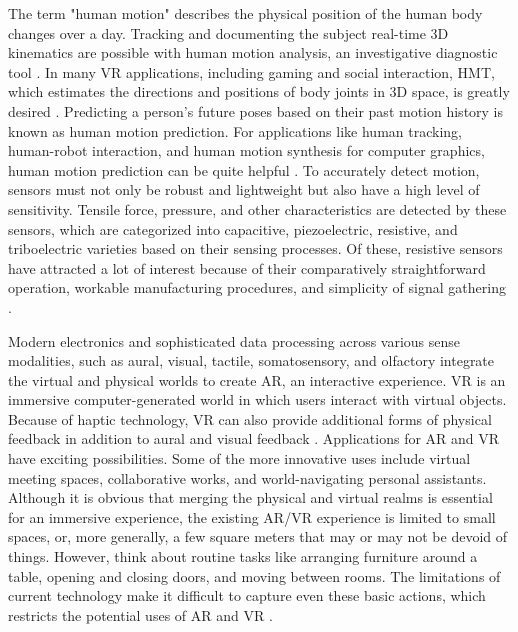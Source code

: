 \documentclass[conference]{IEEEtran}
\begin{document}
The term "human motion" describes the physical position of the human body changes over a day. Tracking and documenting the subject real-time 3D kinematics are possible with human motion analysis, an investigative diagnostic tool \cite{b1}. In many VR applications, including gaming and social interaction, HMT, which estimates the directions and positions of body joints in 3D space, is greatly desired \cite{b2}. Predicting a person's future poses based on their past motion history is known as human motion prediction. For applications like human tracking, human-robot interaction, and human motion synthesis for computer graphics, human motion prediction can be quite helpful \cite{b3}. To accurately detect motion, sensors must not only be robust and lightweight but also have a high level of sensitivity. Tensile force, pressure, and other characteristics are detected by these sensors, which are categorized into capacitive, piezoelectric, resistive, and triboelectric varieties based on their sensing processes. Of these, resistive sensors have attracted a lot of interest because of their comparatively straightforward operation, workable manufacturing procedures, and simplicity of signal gathering \cite{b4}.

Modern electronics and sophisticated data processing across various sense modalities, such as aural, visual, tactile, somatosensory, and olfactory integrate the virtual and physical worlds to create AR, an interactive experience. VR is an immersive computer-generated world in which users interact with virtual objects. Because of haptic technology, VR can also provide additional forms of physical feedback in addition to aural and visual feedback \cite{b5}. Applications for AR and VR have exciting possibilities. Some of the more innovative uses include virtual meeting spaces, collaborative works, and world-navigating personal assistants. Although it is obvious that merging the physical and virtual realms is essential for an immersive experience, the existing AR/VR experience is limited to small spaces, or, more generally, a few square meters that may or may not be devoid of things. However, think about routine tasks like arranging furniture around a table, opening and closing doors, and moving between rooms. The limitations of current technology make it difficult to capture even these basic actions, which restricts the potential uses of AR and VR \cite{b6}.
\end{document}
